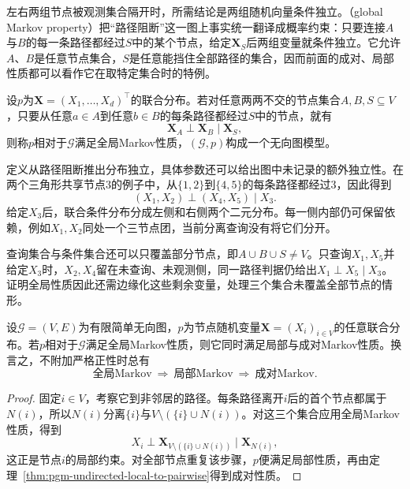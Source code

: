左右两组节点被观测集合隔开时，所需结论是两组随机向量条件独立。（global Markov property）把“路径阻断”这一图上事实统一翻译成概率约束：只要连接$A$与$B$的每一条路径都经过$S$中的某个节点，给定$\bm{X}_S$后两组变量就条件独立。它允许$A$、$B$是任意节点集合，$S$是任意能挡住全部路径的集合，因而前面的成对、局部性质都可以看作它在取特定集合时的特例。

\begin{definition}[全局Markov性质]
  \label{def:pgm-undirected-model}
  设$p$为$\bm{X}=(X_1,\ldots,X_d)^{\top}$的联合分布。若对任意两两不交的节点集合$A,B,S\subseteq V$，只要从任意$a\in A$到任意$b\in B$的每条路径都经过$S$中的节点，就有
  \begin{equation}
    \bm{X}_A\perp\bm{X}_B\mid\bm{X}_S,
    \label{eq:pgm-undirected-global}
  \end{equation}
  则称$p$相对于$\mathcal{G}$满足全局Markov性质，$(\mathcal{G},p)$构成一个无向图模型。
\end{definition}

定义从路径阻断推出分布独立，具体参数还可以给出图中未记录的额外独立性。在两个三角形共享节点$3$的例子中，从$\{1,2\}$到$\{4,5\}$的每条路径都经过$3$，因此得到
\[
  (X_1,X_2)\perp(X_4,X_5)\mid X_3.
\]
给定$X_3$后，联合条件分布分成左侧和右侧两个二元分布。每一侧内部仍可保留依赖，例如$X_1,X_2$同处一个三节点团，当前分离查询没有将它们分开。

查询集合与条件集合还可以只覆盖部分节点，即$A\cup B\cup S\neq V$。只查询$X_1,X_5$并给定$X_3$时，$X_2,X_4$留在未查询、未观测侧，同一路径判据仍给出$X_1\perp X_5\mid X_3$。证明全局性质因此还需边缘化这些剩余变量，处理三个集合未覆盖全部节点的情形。

\begin{theorem}[全局Markov性质蕴含局部与成对Markov性质]
  \label{thm:pgm-undirected-global-implications}
  设$\mathcal{G}=(V,E)$为有限简单无向图，$p$为节点随机变量$\bm{X}=(X_i)_{i\in V}$的任意联合分布。若$p$相对于$\mathcal{G}$满足全局Markov性质，则它同时满足局部与成对Markov性质。换言之，不附加严格正性时总有
  \begin{equation}
    \text{全局Markov}
    \ \Longrightarrow\ \text{局部Markov}
    \ \Longrightarrow\ \text{成对Markov}.
    \label{eq:pgm-undirected-implication}
  \end{equation}
\end{theorem}

\begin{proof}
固定$i\in V$，考察它到非邻居的路径。每条路径离开$i$后的首个节点都属于$N(i)$，所以$N(i)$分离$\{i\}$与$V\setminus(\{i\}\cup N(i))$。对这三个集合应用全局Markov性质，得到
\[
  X_i\perp\bm{X}_{V\setminus(\{i\}\cup N(i))}
  \mid\bm{X}_{N(i)},
\]
这正是节点$i$的局部约束。对全部节点重复该步骤，$p$便满足局部性质，再由定理~\ref{thm:pgm-undirected-local-to-pairwise}得到成对性质。
\end{proof}

